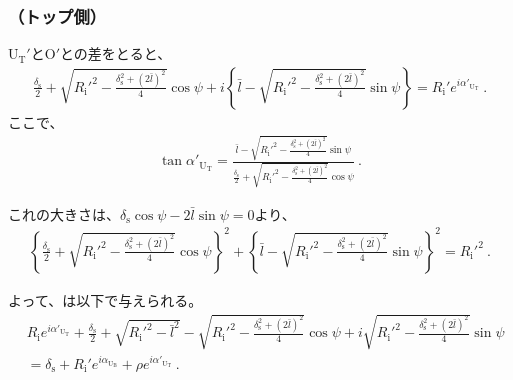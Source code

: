 \subsubsection{\AfterRotatePlateContactPoint（トップ側）}
\AfterRotateReceiverPlateCenter U$_\mathrm T'$と\nameCurvatureCenter O$'$との差をとると、
\begin{align*}
  \frac{\delta_\mathrm s}2+\sqrt{R_\mathrm i'^2-\frac{\delta_\mathrm s^2+(2\bar l)^2}4}\cos\psi
  +i\left\{\bar l-\sqrt{R_\mathrm i'^2-\frac{\delta_\mathrm s^2+(2\bar l)^2}4}\sin\psi\right\}
  = R_\mathrm i'e^{i\alpha'_{\mathrm U_\mathrm T}}\ .
\end{align*}
ここで、
\begin{align*}
  \tan\alpha'_{\mathrm U_\mathrm T}
  = \frac{\displaystyle\bar l-\sqrt{R_\mathrm i'^2-\frac{\delta_\mathrm s^2+(2\bar l)^2}4}\sin\psi}
         {\displaystyle\frac{\delta_\mathrm s}2+\sqrt{R_\mathrm i'^2-\frac{\delta_\mathrm s^2+(2\bar l)^2}4}\cos\psi}\ .
\end{align*}
\begin{hosoku}
これの大きさは、$\delta_\mathrm s\cos\psi-2\bar l\sin\psi = 0$より、
\begin{align*}
  \left\{\frac{\delta_\mathrm s}2+\sqrt{R_\mathrm i'^2-\frac{\delta_\mathrm s^2+(2\bar l)^2}4}\cos\psi\right\}^2
  +\left\{\bar l-\sqrt{R_\mathrm i'^2-\frac{\delta_\mathrm s^2+(2\bar l)^2}4}\sin\psi\right\}^2
  = R_\mathrm i'^2\ .
\end{align*}
\end{hosoku}
よって、\AfterRotatePlateContactPoint は以下で与えられる。
\begin{align*}
  &  R_\mathrm ie^{i\alpha'_{\mathrm U_\mathrm T}}
     +\frac{\delta_\mathrm s}2+\sqrt{R_\mathrm i'^2-\bar l^2}-\sqrt{R_\mathrm i'^2-\frac{\delta_\mathrm s^2+(2\bar l)^2}4}\cos\psi
     +i\sqrt{R_\mathrm i'^2-\frac{\delta_\mathrm s^2+(2\bar l)^2}4}\sin\psi\\
  &= \delta_\mathrm s+R_\mathrm i'e^{i\alpha_{\mathrm U_\mathrm B}}+\rho e^{i\alpha'_{\mathrm U_\mathrm T}}\ .
\end{align*}

